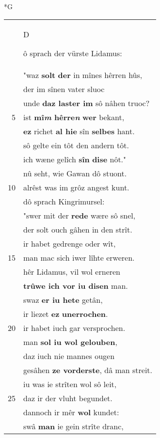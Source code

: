 \documentclass[8pt,a4paper,notitlepage]{article}
\begin{document}
\newpage
\begin{table}[ht]
\begin{minipage}[t]{0.5\linewidth}
\small
\begin{center}*G
\end{center}
\begin{tabular}{rl}
 & \begin{large}D\end{large}ô sprach der vürste Lidamus:\\ 
 & "waz \textbf{solt} \textbf{der} in mînes hêrren hûs,\\ 
 & der im sînen vater sluoc\\ 
 & unde \textbf{daz laster im} sô nâhen truoc?\\ 
5 & ist \textbf{mî\textit{m} hêrre\textit{n}} \textbf{wer} bekant,\\ 
 & \textbf{ez} richet \textbf{al hie} sîn \textbf{selbes} hant.\\ 
 & sô gelte ein tôt den andern tôt.\\ 
 & ich wæne gelîch \textbf{sîn} \textbf{dise} nôt."\\ 
 & nû seht, wie Gawan dô stuont.\\ 
10 & alrêst was im grôz angest kunt.\\ 
 & dô sprach Kingrimursel:\\ 
 & "swer mit der \textbf{rede} wære sô snel,\\ 
 & der solt ouch gâhen in den strît.\\ 
 & ir habet gedrenge oder wît,\\ 
15 & man mac sich iwer lîhte erweren.\\ 
 & hêr Lidamus, vil wol erneren\\ 
 & \textbf{trûwe ich vor iu disen} man.\\ 
 & swaz \textbf{er iu hete} getân,\\ 
 & ir liezet \textbf{ez} \textbf{unerrochen}.\\ 
20 & ir habet iuch gar versprochen.\\ 
 & man \textbf{sol iu wol gelouben},\\ 
 & daz iuch nie mannes ougen\\ 
 & gesâhen \textbf{ze vorderste}, dâ man streit.\\ 
 & iu was ie strîten wol sô leit,\\ 
25 & daz ir der vluht begundet.\\ 
 & dannoch ir mêr \textbf{wol} kundet:\\ 
 & swâ \textbf{man} ie gein strîte dranc,\\ 

\end{tabular}
\end{minipage}
\end{table}
\end{document}
